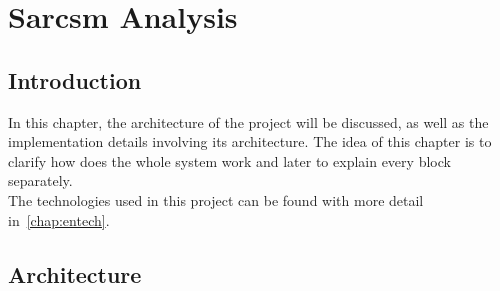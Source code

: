\chapter{Sarcsm Analysis}
\label{chap:architecture}


\section{Introduction}
\label{sec:introduction}
In this chapter, the architecture of the project will be discussed, as well as the implementation details involving its architecture. The idea of this chapter is to clarify how does the whole system work and later to explain every block separately.\\
The technologies used in this project can be found with more detail in~\cref{chap:entech}.

\section{Architecture}
